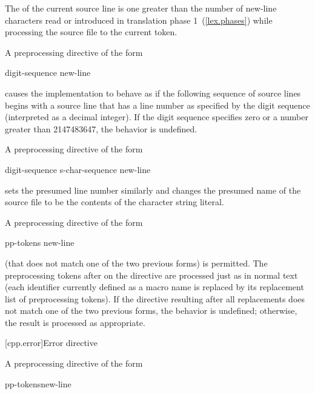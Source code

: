 \pnum
The
of the current source line is one greater than
the number of new-line characters read or introduced
in translation phase 1~(\ref{lex.phases})
while processing the source file to the current token.

\pnum
A preprocessing directive of the form

\begin{ncsimplebnf}
 digit-sequence new-line
\end{ncsimplebnf}

causes the implementation to behave as if
the following sequence of source lines begins with a
source line that has a line number as specified
by the digit sequence (interpreted as a decimal integer).
If the digit sequence specifies zero
or a number greater than 2147483647,
the behavior is undefined.

\pnum
A preprocessing directive of the form

\begin{ncsimplebnf}
 digit-sequence  s-char-sequence\opt{}  new-line
\end{ncsimplebnf}

sets the presumed line number similarly and changes the
presumed name of the source file to be the contents
of the character string literal.

\pnum
A preprocessing directive of the form

\begin{ncsimplebnf}
 pp-tokens new-line
\end{ncsimplebnf}

(that does not match one of the two previous forms)
is permitted.
The preprocessing tokens after
on the directive are processed just as in normal text
(each identifier currently defined as a macro name is replaced by its
replacement list of preprocessing tokens).
If the directive resulting after all replacements does not match
one of the two previous forms, the behavior is undefined;
otherwise, the result is processed as appropriate.

[cpp.error]{Error directive}%
%

\pnum
A preprocessing directive of the form

\begin{ncsimplebnf}
 pp-tokens\opt new-line
\end{ncsimplebnf}

